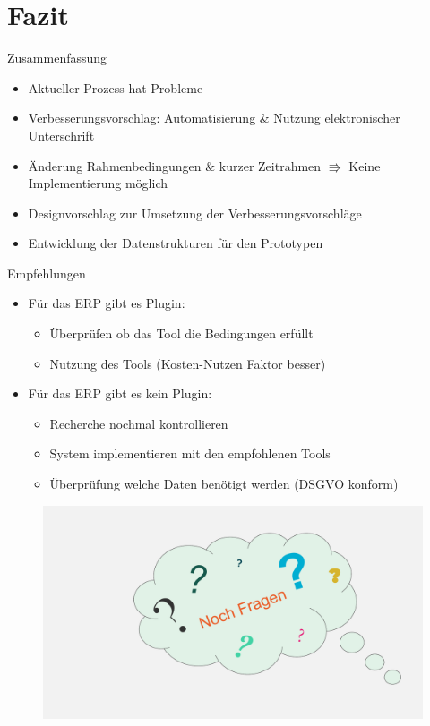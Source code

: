 \documentclass[utf8, xcolor, usenames,dvipsnames, aspectratio=169, notes, ]{beamer}
\begin{document}
\section{Fazit}

\begin{frame}{Zusammenfassung}
	\begin{itemize}
		\item Aktueller Prozess hat Probleme
		\item Verbesserungsvorschlag: Automatisierung \& Nutzung elektronischer Unterschrift
		\item Änderung Rahmenbedingungen \& kurzer Zeitrahmen $\Rrightarrow$ Keine Implementierung möglich
		\item Designvorschlag zur Umsetzung der Verbesserungsvorschläge
		\item Entwicklung der Datenstrukturen für den Prototypen
	\end{itemize}
\end{frame}	

\begin{frame}{Empfehlungen}
	\begin{itemize}
		\item Für das ERP gibt es Plugin:
		\begin{itemize}
			\item Überprüfen ob das Tool die Bedingungen erfüllt
			\item Nutzung des Tools (Kosten-Nutzen Faktor besser)
		\end{itemize}
		\item Für das ERP gibt es kein Plugin:
		\begin{itemize}
			\item Recherche nochmal kontrollieren
			\item System implementieren mit den empfohlenen Tools
			\item Überprüfung welche Daten benötigt werden (DSGVO konform)
		\end{itemize}
	\end{itemize}
\end{frame}

\vspace*{-15mm}   
\begin{frame}
	\begin{figure}
		\hspace*{-15mm}
		\includegraphics[width=\paperwidth, height=\paperheight]{./images/questions.pdf}
	\end{figure}
\end{frame}
\end{document}

